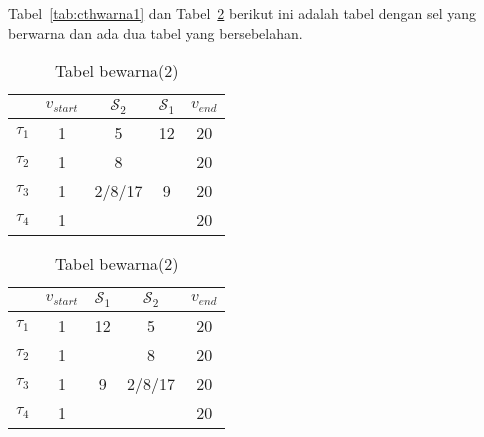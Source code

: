 \begin{enumerate}
\begin{table}[H]
\begin{tabular}{cccc}
		\bottomrule
		
	\end{tabular} 
\end{table}
Tabel~\ref{tab:cthwarna1} dan Tabel~\ref{tab:cthwarna2} berikut ini adalah tabel dengan sel yang berwarna dan ada dua tabel yang bersebelahan. 
\begin{table}[H]
	\begin{minipage}[c]{0.49\linewidth}
		\centering
		\caption{Tabel bewarna(1)}
		\label{tab:cthwarna1}
		\begin{tabular}{ccccc}
			\toprule
			 & $v_{start}$ & $\mathcal{S}_{2}$ & $\mathcal{S}_{1}$ & $v_{end}$\\
			
			\midrule
			$\tau_{1}$ & 1 & 5 \cellcolor{green}& 12& 20\\
			$\tau_{2}$ & 1 & 8 \cellcolor{green}& & 20\\
			$\tau_{3}$ & 1 & 2/8/17 \cellcolor{green}& 9 & 20\\
			$\tau_{4}$ & 1 & \cellcolor{red}& & 20\\
			
			\bottomrule

		\end{tabular}
	\end{minipage}
	\begin{minipage}[c]{0.49\linewidth}
		
		\centering 
		\caption{Tabel bewarna(2)}
		\label{tab:cthwarna2}
		\begin{tabular}{ccccc}
			\toprule
			 & $v_{start}$ & $\mathcal{S}_{1}$ & $\mathcal{S}_{2}$ & $v_{end}$\\
			
			\midrule
			$\tau_{1}$ & 1 & 12& 5 \cellcolor{red} &20\\
			$\tau_{2}$ & 1 &  &  8 \cellcolor{green} &20\\
			$\tau_{3}$ & 1 & 9 & 2/8/17 \cellcolor{green} &20\\
			$\tau_{4}$ & 1 &   & \cellcolor{red} &20\\
			
			\bottomrule
		
		\end{tabular}
	\end{minipage}
\end{table}

 

\end{enumerate}
